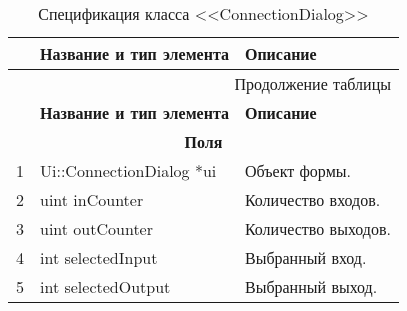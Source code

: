 \small
\singlespacing
\begin{longtable}[h]{|p{}|p{}|p{}|}
  \caption{Спецификация класса <<ConnectionDialog>>}
	\\ \hline
	  \textbf{\No}                  &
	  \textbf{Название и тип элемента}  &
	  \textbf{Описание}
	\\ \hline
  \endfirsthead

  \multicolumn{3}{r}{Продолжение таблицы \thetable{}}
  \\ \hline
	  \textbf{\No}                  &
	  \textbf{Название и тип элемента}  &
	  \textbf{Описание}
	\\ \hline
  \endhead

  \multicolumn{3}{|c|}{\textbf{Поля}} \\
  \hline
  1 & Ui::ConnectionDialog *ui & Объект формы. \\ \hline
  2 & uint inCounter & Количество входов. \\ \hline
  3 & uint outCounter & Количество выходов. \\ \hline
  4 & int selectedInput & Выбранный вход. \\ \hline
  5 & int selectedOutput & Выбранный выход. \\ \hline


\end{longtable}

